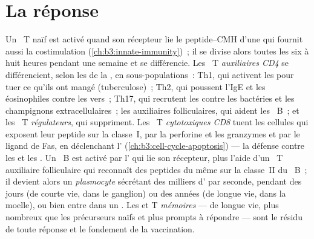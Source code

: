\section{La réponse}

\begin{definition}\label{def:b3:adaptive-immunity:response}
Un ~T naïf est activé quand son récepteur lie le peptide--CMH
d'une  qui fournit aussi la costimulation
(\cref{ch:b3:innate-immunity})~; il se divise alors toutes les six à
huit heures pendant une semaine et se différencie. Les ~T
\emph{auxiliaires CD4} se différencient, selon les  de la
, en sous-populations~: Th1, qui activent les
 pour tuer ce qu'ils ont mangé (tuberculose)~; Th2, qui
poussent l'IgE et les éosinophiles contre les vers~; Th17, qui recrutent
les  contre les bactéries et les champignons
extracellulaires~; les auxiliaires folliculaires, qui aident les
~B~; et les ~T \emph{régulateurs}, qui suppriment.
Les ~T \emph{cytotoxiques CD8} tuent les cellules qui
exposent leur peptide sur la classe~I, par la perforine et les granzymes
et par le ligand de Fas, en déclenchant l'
(\cref{ch:b3:cell-cycle-apoptosis}) --- la défense contre les  et
les . Un ~B est activé par l' qui lie son
récepteur, plus l'aide d'un ~T auxiliaire folliculaire qui
reconnaît des peptides du même  sur la classe~II du
~B~; il devient alors un \emph{plasmocyte} sécrétant des
milliers d' par seconde, pendant des jours (de courte vie, dans
le ganglion) ou des années (de longue vie, dans la moelle), ou bien
entre dans un . Les  et T \emph{mémoires}
--- de longue vie, plus nombreux que les précurseurs naïfs et plus
prompts à répondre --- sont le résidu de toute réponse et le fondement
de la vaccination.
\end{definition}

